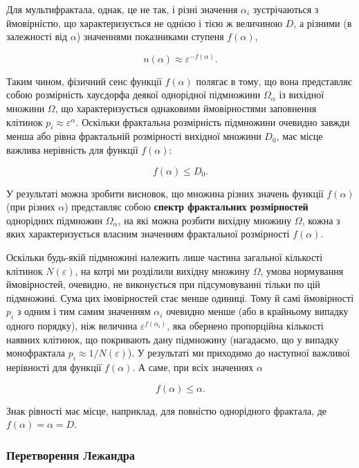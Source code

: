 \documentclass[
  letterpaper,
]{report}
\begin{document}
Для мультифрактала, однак, це не так, і різні значення \(\alpha_{i}\)
зустрічаються з ймовірністю, що характеризується не однією і тією ж
величиною \(D\), а різними (в залежності від \(\alpha\)) значеннями
показниками ступеня \(f(\alpha)\),

\[\tag{5}
n(\alpha) \approx \varepsilon^{-f(\alpha)}.
\]

Таким чином, фізичний сенс функції \(f(\alpha)\) полягає в тому, що вона
представляє собою розмірність хаусдорфа деякої однорідної підмножини
\(\Omega_{\alpha}\) із вихідної множини \(\Omega\), що характеризується
однаковими ймовірностями заповнення клітинок
\(p_{i} \approx \varepsilon^{\alpha}\). Оскільки фрактальна розмірність
підмножини очевидно завжди менша або рівна фрактальній розмірності
вихідної множини \(D_{0}\), має місце важлива нерівність для функції
\(f(\alpha)\):

\[
f(\alpha) \leq D_{0}. 
\]

У результаті можна зробити висновок, що множина різних значень функції
\(f(\alpha)\) (при різних \(\alpha\)) представляє собою \textbf{спектр
фрактальних розмірностей} однорідних підмножин \(\Omega_{\alpha}\), на
які можна розбити вихідну множину \(\Omega\), кожна з яких
характеризується власним значенням фрактальної розмірності
\(f(\alpha)\).

Оскільки будь-якій підмножині належить лише частина загальної кількості
клітинок \(N(\varepsilon)\), на котрі ми розділили вихідну множину
\(\Omega\), умова нормування ймовірностей, очевидно, не виконується при
підсумовуванні тільки по цій підмножині. Сума цих імовірностей стає
менше одиниці. Тому й самі ймовірності \(p_i\) з одним і тим самим
значенням \(\alpha_i\) очевидно менше (або в крайньому випадку одного
порядку), ніж величина \(\varepsilon^{f(\alpha_i)}\), яка обернено
пропорційна кількості наявних клітинок, що покривають дану підмножину
(нагадаємо, що у випадку монофрактала \(p_i \approx 1/N(\varepsilon)\)).
У результаті ми приходимо до наступної важливої нерівності для функції
\(f(\alpha)\). А саме, при всіх значеннях \(\alpha\)

\[
f(\alpha) \leq \alpha. 
\]

Знак рівності має місце, наприклад, для повністю однорідного фрактала,
де \(f(\alpha)=\alpha=D\).

\hypertarget{ux43fux435ux440ux435ux442ux432ux43eux440ux435ux43dux43dux44f-ux43bux435ux436ux430ux43dux434ux440ux430}{%
\subsubsection{Перетворення
Лежандра}\label{ux43fux435ux440ux435ux442ux432ux43eux440ux435ux43dux43dux44f-ux43bux435ux436ux430ux43dux434ux440ux430}}
\end{document}
